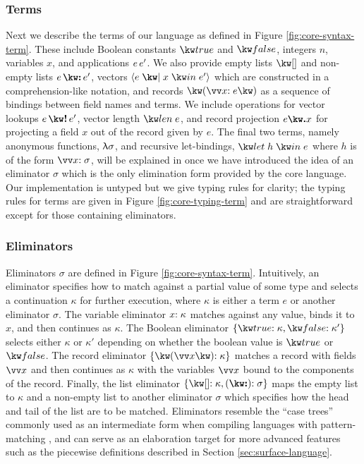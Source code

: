 \subsubsection{Terms}
Next we describe the terms of our language as defined in Figure \ref{fig:core-syntax-term}.  These include Boolean constants $\exTrue$ and $\exFalse$, integers $n$, variables $x$, and applications ${e}\,{e'}$. We also provide empty lists $\exNil$ and non-empty lists $\exCons{e}{e'}$, vectors $\exVec{e}{x}{e'}$ which are constructed in a comprehension-like notation, and records $\exRec{\vec{\bind{x}{e}}}$ as a sequence of bindings between field names and terms. We include operations for vector lookups $\exVecLookup{e}{e'}$, vector length $\exVecLen{e}$, and record projection $\exRecProj{e}{x}$ for projecting a field $x$ out of the record given by $e$. The final two terms, namely anonymous functions, $\uplambda{\sigma}$, and recursive let-bindings, $\exLetRecMutual{h}{e}$ where $h$ is of the form $\vec{\bind{x}{\sigma}}$, will be explained in  once we have introduced the idea of an eliminator $\sigma$ which is the only elimination form provided by the core language. Our implementation is untyped but we give typing rules for clarity; the typing rules for terms are given in Figure \ref{fig:core-typing-term} and are straightforward except for those containing eliminators.



\noindent

\subsubsection{Eliminators}
\label{sec:core-language:syntax-eliminator}
Eliminators $\sigma$ are defined in Figure \ref{fig:core-syntax-term}. Intuitively, an eliminator specifies how to match against a partial value of some type and selects a continuation $\kappa$ for further execution, where $\kappa$ is either a term $e$ or another eliminator $\sigma$. The variable eliminator ${x}{:}\;{\kappa}$ matches against any value, binds it to $x$, and then continues as $\kappa$. The Boolean eliminator $\elimBool{\kappa}{\kappa'}$ selects either $\kappa$ or $\kappa'$ depending on whether the boolean value is $\exTrue$ or $\exFalse$. The record eliminator $\elimRec{\seq{x}}{\kappa}$ matches a record with fields $\seq{x}$ and then continues as $\kappa$ with the variables $\seq{x}$ bound to the components of the record. Finally, the list eliminator $\elimList{\kappa}{\sigma}$ maps the empty list to $\kappa$ and a non-empty list to another eliminator $\sigma$ which specifies how the head and tail of the list are to be matched. Eliminators resemble the ``case trees'' commonly used as an intermediate form when compiling languages with pattern-matching \cite{graf20}, and can serve as an elaboration target for more advanced features such as the piecewise definitions described in Section \ref{sec:surface-language}.


